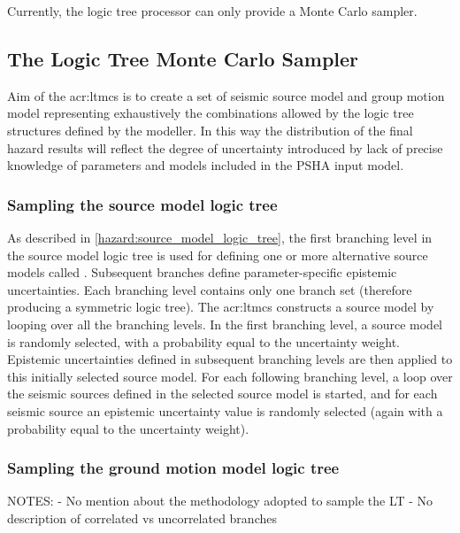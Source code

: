Currently, the logic tree processor can only provide a Monte 
Carlo sampler.
%
\subsection{The Logic Tree Monte Carlo Sampler}
Aim of the \gls{acr:ltmcs} is to create a set of seismic source model 
and group motion model representing exhaustively the combinations 
allowed by the logic tree structures defined by the modeller.
% 
In this way the distribution of the final hazard results will reflect 
the degree of uncertainty introduced by lack of precise knowledge 
of parameters and models included in the PSHA input model.
%
\subsubsection{Sampling the source model logic tree}
As described in \ref{hazard:source_model_logic_tree}, the first branching 
level in the source model logic tree is used for defining one or more 
alternative source models called . 
Subsequent branches define parameter-specific 
epistemic uncertainties. Each branching level contains only one branch set 
(therefore producing a symmetric logic tree). 
%
The \gls{acr:ltmcs} constructs a source model by looping over all the 
branching levels. In the first branching level, a source model is randomly 
selected, with a probability equal to the 
uncertainty weight. Epistemic uncertainties defined in subsequent branching 
levels are then applied to this initially selected source model. For each 
following branching level, a loop over the seismic sources defined in the 
selected source model is started, and for each seismic source an epistemic 
uncertainty value is randomly selected (again with a probability equal to 
the uncertainty weight).
%
\subsubsection{Sampling the ground motion model logic tree}

\dotfill \newline
NOTES:
- No mention about the methodology adopted to sample the LT
- No description of correlated vs uncorrelated branches
\hfill \clearpage

